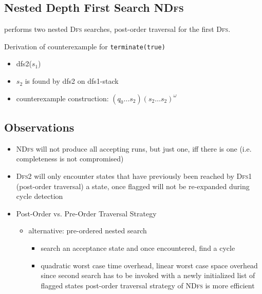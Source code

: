 \documentclass[a4paper, 10pt]{article}
\begin{document}
\subsection*{Nested Depth First Search \textsc{NDfs}}
performs two nested \textsc{Dfs} searches, post-order traversal for the first \textsc{Dfs}. \\

\begin{minipage}[]{0.6\textwidth}
Derivation of counterexample for \texttt{terminate(true)}
\begin{itemize}
    \item dfs2($s_1$)
    \item $s_2$ is found by dfs2 on dfs1-stack
    \item counterexample construction: $(q_0\dots s_2)(s_2\dots s_2)^\omega$
\end{itemize}
\end{minipage}
\begin{minipage}[]{0.28\textwidth}
    \begin{center}
    \scalebox{1}{}
    \end{center}
\end{minipage}
\subsection*{Observations}
\begin{itemize}
    \item \textsc{NDfs} will not produce all accepting runs, but just one, iff there is one (i.e. completeness is not compromised)
    \item \textsc{Dfs2} will only encounter states that have previously been reached by \textsc{Dfs1} (post-order traversal) \follows a state, once flagged will not be re-expanded during cycle detection
    \item Post-Order vs. Pre-Order Traversal Strategy
    \begin{itemize}
        \item alternative: pre-ordered nested search
        \begin{itemize}
            \item search an acceptance state and once encountered, find a cycle
            \item quadratic worst case time overhead, linear worst case space overhead \follows since second search has to be invoked with a newly initialized list of flagged states
            \fitem post-order traversal strategy of \textsc{NDfs} is more efficient
        \end{itemize}
    \end{itemize}
\end{itemize}
\end{document}
